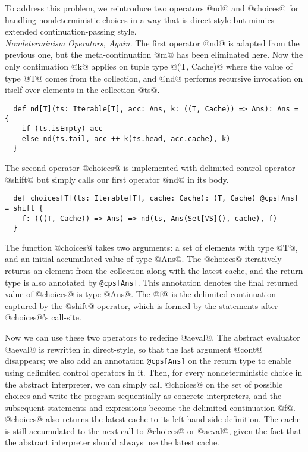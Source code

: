 \documentclass[acmsmall, review]{acmart}\settopmatter{}
\begin{document}
To address this problem, we reintroduce two operators @nd@ and @choices@ for handling 
nondeterministic choices in a way that is direct-style but mimics extended 
continuation-passing style. \\

\textit{Nondeterminism Operators, Again.}
The first operator @nd@ is adapted from the previous one, but the meta-continuation
@m@ has been eliminated here. Now the only continuation @k@ applies on tuple type @(T, Cache)@ 
where the value of type @T@ comes from the collection, and @nd@ performs recursive invocation
on itself over elements in the collection @ts@. 

\begin{lstlisting}
  def nd[T](ts: Iterable[T], acc: Ans, k: ((T, Cache)) => Ans): Ans = {
    if (ts.isEmpty) acc
    else nd(ts.tail, acc ++ k(ts.head, acc.cache), k)
  }
\end{lstlisting}

The second operator @choices@ is implemented with delimited control operator 
@shift@ but simply calls our first operator @nd@ in its body.

\begin{lstlisting}
  def choices[T](ts: Iterable[T], cache: Cache): (T, Cache) @cps[Ans] = shift {
    f: (((T, Cache)) => Ans) => nd(ts, Ans(Set[VS](), cache), f)
  }
\end{lstlisting}

The function @choices@ takes two arguments: a set of elements with type @T@, 
and an initial accumulated value of type @Ans@.
The @choices@ iteratively returns an element from the collection along with the 
latest cache, and the return type is also annotated by \verb|@cps[Ans]|. 
This annotation denotes the final returned value of @choices@ is type @Ans@.
The @f@ is the delimited continuation captured by the @shift@ operator, which
is formed by the statements after @choices@'s call-site.

Now we can use these two operators to redefine @aeval@. The abstract evaluator @aeval@ is
rewritten in direct-style, so that the last argument @cont@ disappears; we also add an 
annotation \verb|@cps[Ans]| on the return type to enable using delimited control operators 
in it.
Then, for every nondeterministic choice in the abstract interpreter, we can simply call 
@choices@ on the set of possible choices and write the program sequentially as concrete 
interpreters, and the subsequent statements and expressions become the delimited continuation
@f@. @choices@ also returns the latest cache to its left-hand side definition.
The cache is still accumulated to the next call to @choices@ or @aeval@, 
given the fact that the abstract interpreter should always use the latest cache.
\end{document}
